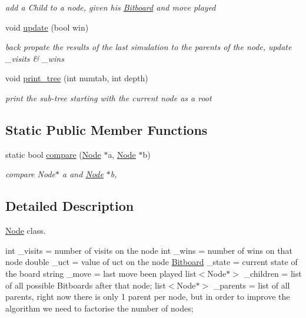 \begin{DoxyCompactItemize}
\begin{DoxyCompactList}\small\item\em add a Child to a node, given his \hyperlink{class_bitboard}{Bitboard} and move played \end{DoxyCompactList}\item 
void \hyperlink{classmcts_1_1_node_a57447b6e52620751c5ff5d791d857798}{update} (bool win)
\begin{DoxyCompactList}\small\item\em back propate the results of the last simulation to the parents of the node, update \+\_\+visits \& \+\_\+wins \end{DoxyCompactList}\item 
void \hyperlink{classmcts_1_1_node_a7a4c678e7229510df95df9b85b8bdee7}{print\+\_\+tree} (int numtab, int depth)
\begin{DoxyCompactList}\small\item\em print the sub-\/tree starting with the current node as a root \end{DoxyCompactList}\end{DoxyCompactItemize}
\subsection*{Static Public Member Functions}
\begin{DoxyCompactItemize}
\item 
static bool \hyperlink{classmcts_1_1_node_a8903c49cabb4206c7e9b6a9b5a127713}{compare} (\hyperlink{classmcts_1_1_node}{Node} $\ast$a, \hyperlink{classmcts_1_1_node}{Node} $\ast$b)
\begin{DoxyCompactList}\small\item\em compare Node$\ast$ a and \hyperlink{classmcts_1_1_node}{Node} $\ast$b, \end{DoxyCompactList}\end{DoxyCompactItemize}


\subsection{Detailed Description}
\hyperlink{classmcts_1_1_node}{Node} class. 

int \+\_\+visits = number of visits on the node int \+\_\+wins = number of wins on that node double \+\_\+uct = value of uct on the node \hyperlink{class_bitboard}{Bitboard} \+\_\+state = current state of the board string \+\_\+move = last move been played list$<$\+Node$\ast$$>$ \+\_\+children = list of all possible Bitboards after that node; list$<$\+Node$\ast$$>$ \+\_\+parents = list of all parents, right now there is only 1 parent per node, but in order to improve the algorithm we need to factorise the number of nodes; 

